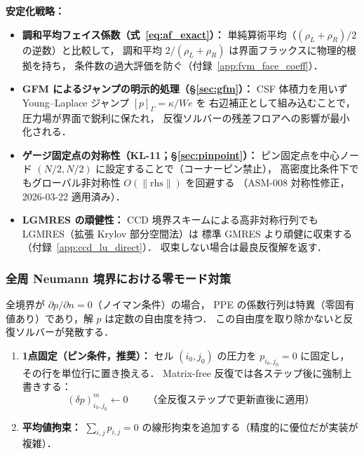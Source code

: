 \noindent\textbf{安定化戦略：}
\begin{itemize}
  \item \textbf{調和平均フェイス係数（式~\eqref{eq:af_exact}）：}
        単純算術平均（$(\rho_L+\rho_R)/2$ の逆数）と比較して，
        調和平均 $2/(\rho_L+\rho_R)$ は界面フラックスに物理的根拠を持ち，
        条件数の過大評価を防ぐ（付録~\ref{app:fvm_face_coeff}）．
  \item \textbf{GFM によるジャンプの明示的処理（§\ref{sec:gfm}）：}
        CSF 体積力を用いず Young--Laplace ジャンプ $[p]_\Gamma = \kappa/We$ を
        右辺補正として組み込むことで，圧力場が界面で鋭利に保たれ，
        反復ソルバーの残差フロアへの影響が最小化される．
  \item \textbf{ゲージ固定点の対称性（KL-11；§\ref{sec:pinpoint}）：}
        ピン固定点を中心ノード $(N/2, N/2)$ に設定することで（コーナーピン禁止），
        高密度比条件下でもグローバル非対称性 $O(\|\mathrm{rhs}\|)$ を回避する
        （ASM-008 対称性修正，2026-03-22 適用済み）．
  \item \textbf{LGMRES の頑健性：}
        CCD 境界スキームによる高非対称行列でも LGMRES（拡張 Krylov 部分空間法）は
        標準 GMRES より頑健に収束する（付録~\ref{app:ccd_lu_direct}）．
        収束しない場合は最良反復解を返す．
\end{itemize}

\subsubsection{全周 Neumann 境界における零モード対策}
\label{sec:ppe_zero_mode}

全境界が $\partial p/\partial n = 0$（ノイマン条件）の場合，
PPE の係数行列は特異（零固有値あり）であり，解 $p$ は定数の自由度を持つ．
この自由度を取り除かないと反復ソルバーが発散する．

\begin{enumerate}
  \item \textbf{1点固定（ピン条件，推奨）：}
        セル $(i_0, j_0)$ の圧力を $p_{i_0,j_0} = 0$ に固定し，その行を単位行に置き換える．
        Matrix-free 反復では各ステップ後に強制上書きする：
        \begin{equation}
          (\delta p)^m_{i_0, j_0} \leftarrow 0
          \qquad \text{（全反復ステップで更新直後に適用）}
          \label{eq:pin_overwrite}
        \end{equation}
  \item \textbf{平均値拘束：} $\sum_{i,j} p_{i,j} = 0$ の線形拘束を追加する（精度的に優位だが実装が複雑）．
\end{enumerate}

